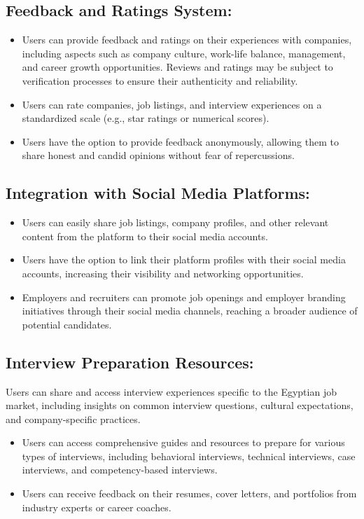 \documentclass[titlepage]{article}
\begin{document}
\subsection{Feedback and Ratings System:}
\begin{itemize}
    \item Users can provide feedback and ratings on their experiences with companies, including aspects such as company culture, work-life balance, management, and career growth opportunities. Reviews and ratings may be subject to verification processes to ensure their authenticity and reliability.
    \item Users can rate companies, job listings, and interview experiences on a standardized scale (e.g., star ratings or numerical scores).
    \item Users have the option to provide feedback anonymously, allowing them to share honest and candid opinions without fear of repercussions.
\end{itemize}
\subsection{Integration with Social Media Platforms:}
\begin{itemize}
    \item Users can easily share job listings, company profiles, and other relevant content from the platform to their social media accounts.
    \item Users have the option to link their platform profiles with their social media accounts, increasing their visibility and networking opportunities.
    \item Employers and recruiters can promote job openings and employer branding initiatives through their social media channels, reaching a broader audience of potential candidates.
\end{itemize}
\subsection{Interview Preparation Resources:}
Users can share and access interview experiences specific to the Egyptian job market, including insights on common interview questions, cultural expectations, and company-specific practices.
\begin{itemize}
    \item Users can access comprehensive guides and resources to prepare for various types of interviews, including behavioral interviews, technical interviews, case interviews, and competency-based interviews.
    \item Users can receive feedback on their resumes, cover letters, and portfolios from industry experts or career coaches.
\end{itemize}
\end{document}
